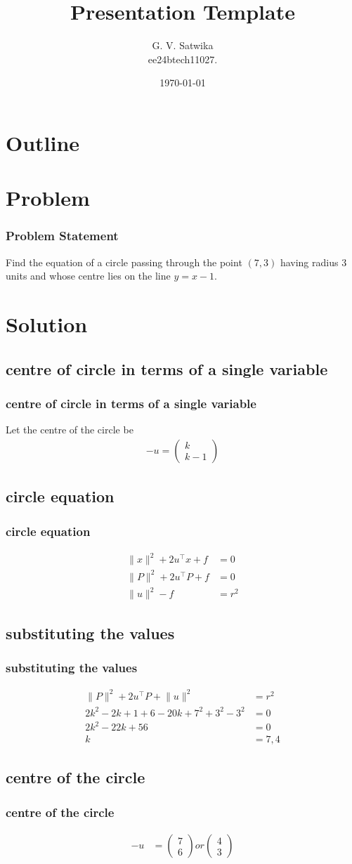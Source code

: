 \documentclass{beamer}
\title{Presentation Template}
\author{G. V. Satwika\\ ee24btech11027.}
\date{\today}
\providecommand{\brak}[1]{\ensuremath{\left(#1\right)}}
\theoremstyle{remark}
\providecommand{\norm}[1]{\lVert#1\rVert}
\newcommand{\myvec}[1]{\ensuremath{\begin{pmatrix}#1\end{pmatrix}}}
\numberwithin{equation}{section}
\begin{document}
\begin{frame}
\titlepage
\end{frame}

\section*{Outline}
\begin{frame}
\tableofcontents
\end{frame}
\section{Problem}
\begin{frame}
\frametitle{Problem Statement}
Find the equation of a circle passing through the point \brak{7,3} having radius 3 units and whose centre lies on the line $y=x-1$.\\
\end{frame}
\section{Solution}
\subsection{centre of circle in terms of a single  variable}
\begin{frame}
\frametitle{centre of circle in terms of a single  variable}
    Let the centre of the circle be 
    \begin{align}
        -u=\myvec{k \\ k-1}
    \end{align}
\end{frame}
\subsection{circle equation}
\begin{frame}
\frametitle{circle equation}
    \begin{align}
	\norm{x}^2 + 2u^\top x + f &= 0\\
	\norm{P}^2 + 2u^\top P + f &= 0\\ 
	\norm{u}^2 - f &= r^2
\end{align}
\end{frame} 
\subsection{substituting the values}
\begin{frame}
\frametitle{substituting the values}
    \begin{align}
	\norm{P}^2 + 2u^\top P + \norm{u}^2 &= r^2 \\
    2k^2-2k+1+6-20k+7^2+3^2-3^2 &=0 \\
	2k^2-22k+56 &=0 \\
	k &=7,4
 \end{align}
\end{frame}
\subsection{centre of the circle}
\begin{frame}
\frametitle{centre of the circle}
    \begin{align}
	-u&=\myvec{7\\6} or \myvec{4\\3}	
\end{align}
\end{frame}
\end{document}
